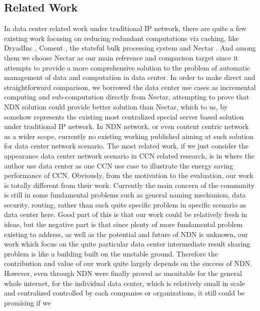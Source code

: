 \documentclass[journal]{IEEEtran}
\begin{document}
\subsection{Related Work}
In data center related work under traditional IP network, there are 
quite a few existing work focusing on reducing redundant computations 
via caching, like DryadInc \cite{Isard:2007:DDD:1272996.1273005}, Coment \cite{He:2010:CBS:1807128.1807139}, the stateful bulk 
processing system \cite{Logothetis:2010:SBP:1807128.1807138} and Nectar \cite{gunda2010nectar}. And among them we choose Nectar 
as our main reference and comparison target since it attempts to 
provide a more comprehensive solution to the problem of automatic 
management of data and computation in data center. In order to make 
direct and straightforward comparison, we borrowed the data center use 
cases as incremental computing and sub-computation directly from 
Nectar, attempting to prove that NDN solution could provide better 
solution than Nectar, which to us, by somehow represents the existing 
most centralized special server based solution under traditional IP 
network. 
In NDN network, or even content centric network as a wider scope, 
currently no existing working published aiming at such solution for 
data center network scenario. The most related work, if we just 
consider the appearance data center network scenario in CCN related 
research, is in \cite{lee2010greening} where the author use data center as one CCN use 
case to illustrate the energy saving performance of CCN. Obviously, 
from the motivation to the evaluation, our work is totally different 
from their work. 
Currently the main concern of the community is still in some 
fundamental problems such as general naming mechanism, data security, 
routing, rather than such quite specific problem in specific scenario 
as data center here. Good part of this is that our work could be 
relatively fresh in ideas, but the negative part is that since plenty 
of more fundamental problem existing to address, as well as the 
potential and future of NDN is unknown, our work which focus on the 
quite particular data center intermediate result sharing problem is 
like a building built on the unstable ground. Therefore the 
contribution and value of our work quite largely depends on the 
success of NDN. However, even through NDN were finally proved as 
unsuitable for the general whole internet, for the individual data 
center, which is relatively small in scale and centralized controlled 
by each companies or organizations, it still could be promising if we 
\end{document}
